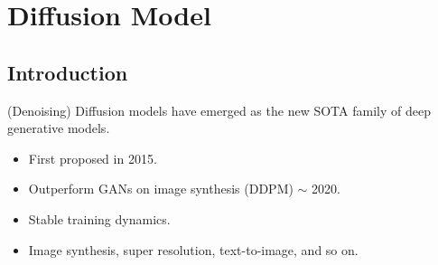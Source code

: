 \chapter{Diffusion Model}
\section{Introduction}

	(Denoising) Diffusion models have emerged as the new SOTA family of deep generative models. 
	\begin{itemize}
		\item First proposed in 2015.
		\item Outperform GANs on image synthesis (DDPM) $\sim$ 2020.
		\item Stable training dynamics.
		\item Image synthesis, super resolution, text-to-image, and so on.
	\end{itemize}

